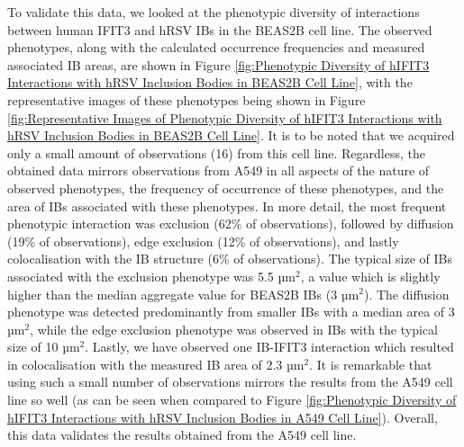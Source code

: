 To validate this data, we looked at the phenotypic diversity of interactions between human IFIT3 and hRSV IBs in the BEAS2B cell line. The observed phenotypes, along with the calculated occurrence frequencies and measured associated IB areas, are shown in Figure \ref{fig:Phenotypic Diversity of hIFIT3 Interactions with hRSV Inclusion Bodies in BEAS2B Cell Line}, with the representative images of these phenotypes being shown in Figure \ref{fig:Representative Images of Phenotypic Diversity of hIFIT3 Interactions with hRSV Inclusion Bodies in BEAS2B Cell Line}. It is to be noted that we acquired only a small amount of observations (16) from this cell line. Regardless, the obtained data mirrors observations from A549 in all aspects of the nature of observed phenotypes, the frequency of occurrence of these phenotypes, and the area of IBs associated with these phenotypes. In more detail, the most frequent phenotypic interaction was exclusion (62\% of observations), followed by diffusion (19\% of observations), edge exclusion (12\% of observations), and lastly colocalisation with the IB structure (6\% of observations). The typical size of IBs associated with the exclusion phenotype was 5.5 \(\mbox{µm}^2\), a value which is slightly higher than the median aggregate value for BEAS2B IBs (3 \(\mbox{µm}^2\)). The diffusion phenotype was detected predominantly from smaller IBs with a median area of 3 \(\mbox{µm}^2\), while the edge exclusion phenotype was observed in IBs with the typical size of 10 \(\mbox{µm}^2\). Lastly, we have observed one IB-IFIT3 interaction which resulted in colocalisation with the measured IB area of 2.3 \(\mbox{µm}^2\). It is remarkable that using such a small number of observations mirrors the results from the A549 cell line so well (as can be seen when compared to Figure \ref{fig:Phenotypic Diversity of hIFIT3 Interactions with hRSV Inclusion Bodies in A549 Cell Line}). Overall, this data validates the results obtained from the A549 cell line.

